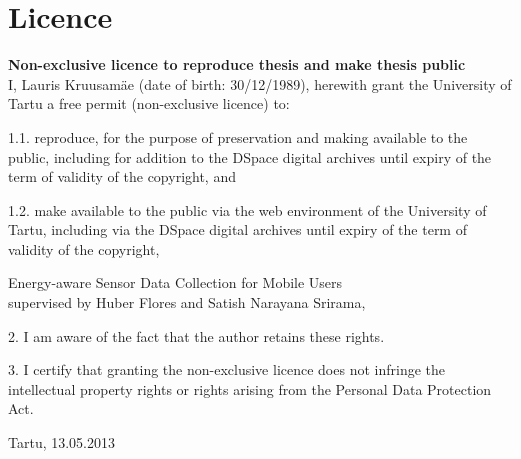 \documentclass[oneside,a4paper,12pt]{Latex/Classes/PhDthesisPSnPDF}
\begin{document}
\backmatter

\newpage

\chapter{Licence}

\textbf{Non-exclusive licence to reproduce thesis and make thesis public}\\

I, Lauris Kruusamäe (date of birth: 30/12/1989), herewith grant the University of Tartu a free permit (non-exclusive licence) to: 

1.1. reproduce, for the purpose of preservation and making available to the public, including for addition to the DSpace digital archives until expiry of the term of validity of the copyright, and

1.2. make available to the public via the web environment of the University of Tartu, including via the DSpace digital archives until expiry of the term of validity of the copyright,

\begin{center}
Energy-aware Sensor Data Collection for Mobile Users\\
supervised by Huber Flores and Satish Narayana Srirama,
\end{center}

2. I am aware of the fact that the author retains these rights.

3. I certify that granting the non-exclusive licence does not infringe the intellectual property rights or rights arising from the Personal Data Protection Act. 

\begin{center}
\vspace{3cm}
Tartu, 13.05.2013
\end{center}
\newpage




\end{document}
